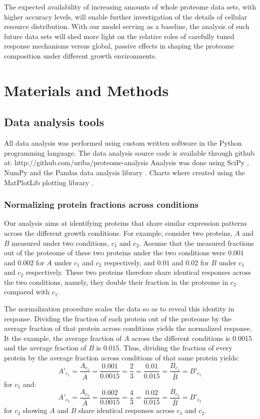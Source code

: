 \documentclass{article}
\begin{document}
The expected availability of increasing amounts of whole proteome data sets, with higher accuracy levels, will enable further investigation of the details of cellular resource distribution.
With our model serving as a baseline, the analysis of such future data sets will shed more light on the relative roles of carefully tuned response mechanisms versus global, passive effects in shaping the proteome composition under different growth environments.

\section{Materials and Methods}
\subsection{Data analysis tools}
All data analysis was performed using custom written software in the Python programming language.
The data analysis source code is available through github at: http://github.com/uriba/proteome-analysis
Analysis was done using SciPy \cite{Oliphant2007}, NumPy \cite{Community2011} and the Pandas data analysis library \cite{McKinney2011}.
Charts where created using the MatPlotLib plotting library \cite{Hunter2007}.

\subsubsection{Normalizing protein fractions across conditions}
\label{concacrossconds} 
Our analysis aims at identifying proteins that share similar expression patterns across the different growth conditions.
For example, consider two proteins, $A$ and $B$ measured under two conditions, $c_1$ and $c_2$.
Assume that the measured fractions out of the proteome of these two proteins under the two conditions were $0.001$ and $0.002$ for $A$ under $c_1$ and $c_2$ respectively, and $0.01$ and $0.02$ for $B$ under $c_1$ and $c_2$ respectively.
These two proteins therefore share identical responses across the two conditions, namely, they double their fraction in the proteome in $c_2$ compared with $c_1$.

The normalization procedure scales the data so as to reveal this identity in response.
Dividing the fraction of each protein out of the proteome by the average fraction of that protein across conditions yields the normalized response.
It the example, the average fraction of $A$ across the different conditions is $0.0015$ and the average fraction of $B$ is $0.015$.
Thus, dividing the fraction of every protein by the average fraction across conditions of that same protein yields:
\[
A'_{c_1}=\frac{A_{c_1}}{\bar{A}}=\frac{0.001}{0.0015}=\frac{2}{3}=\frac{0.01}{0.015}=\frac{B_{c_1}}{\bar{B}}=B'_{c_1}
\]
for $c_1$ and:
\[
A'_{c_2}=\frac{A_{c_2}}{\bar{A}}=\frac{0.002}{0.0015}=\frac{4}{3}=\frac{0.02}{0.015}=\frac{B_{c_2}}{\bar{B}}=B'_{c_2}
\]
for $c_2$ showing $A$ and $B$ share identical responses across $c_1$ and $c_2$.
\end{document}
